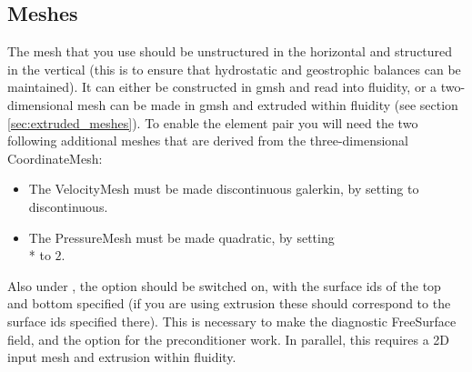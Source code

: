 \subsection{Meshes}

The mesh that you use should be unstructured in the horizontal and structured
in the vertical (this is to ensure that hydrostatic and geostrophic balances can
be maintained). It can either be constructed in gmsh and read into fluidity, or
a two-dimensional mesh can be made in gmsh and extruded within fluidity (see
section \ref{sec:extruded_meshes}). To enable the \PoDGPt element pair you will need
the two following additional meshes that are derived from the three-dimensional
CoordinateMesh:
\begin{itemize}
\item The VelocityMesh must be made discontinuous galerkin, by setting
   to discontinuous.  
\item The PressureMesh must be made quadratic, by setting
\\*   to $2$.  
\end{itemize}
Also under , the  option
should be switched on, with the surface ids of the top and bottom specified (if
you are using extrusion these should correspond to the surface ids specified
there). This is necessary to make the diagnostic FreeSurface field, and the
 option for the  preconditioner work. In
parallel, this requires a 2D input mesh and extrusion within fluidity.

